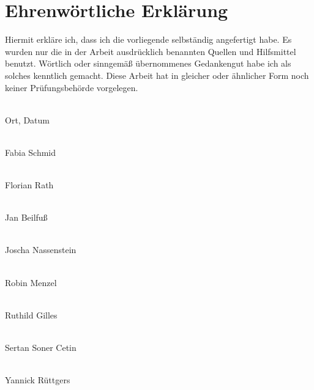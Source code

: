 
\section*{Ehrenwörtliche Erklärung}

Hiermit erkläre ich, dass ich die vorliegende \dokumententyp{} selbständig angefertigt habe. Es wurden nur die in der Arbeit ausdrücklich benannten Quellen und Hilfsmittel benutzt. Wörtlich oder sinngemäß übernommenes Gedankengut habe ich als solches kenntlich gemacht. Diese Arbeit hat in gleicher oder ähnlicher Form noch keiner Prüfungsbehörde vorgelegen.
\vspace{20mm}


\underline{\hspace{8cm}}\\ Ort, Datum
\vspace{10mm}

\underline{\hspace{8cm}}\\ Fabia Schmid

\underline{\hspace{8cm}}\\ Florian Rath

\underline{\hspace{8cm}}\\ Jan Beilfuß

\underline{\hspace{8cm}}\\ Joscha Nassenstein

\underline{\hspace{8cm}}\\ Robin Menzel

\underline{\hspace{8cm}}\\ Ruthild Gilles

\underline{\hspace{8cm}}\\ Sertan Soner Cetin

\underline{\hspace{8cm}}\\ Yannick Rüttgers